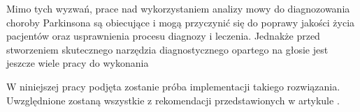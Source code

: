 Mimo tych wyzwań, prace nad wykorzystaniem analizy mowy do diagnozowania choroby Parkinsona są obiecujące i mogą przyczynić się do poprawy jakości życia
pacjentów oraz usprawnienia procesu diagnozy i leczenia.
Jednakże przed stworzeniem skutecznego narzędzia diagnostycznego opartego na głosie jest jeszcze wiele pracy do wykonania

W niniejszej pracy podjęta zostanie próba implementacji takiego rozwiązania.
Uwzględnione zostaną wszystkie z rekomendacji przedstawionych w artykule \cite{SustainedVowelsProblems}.
